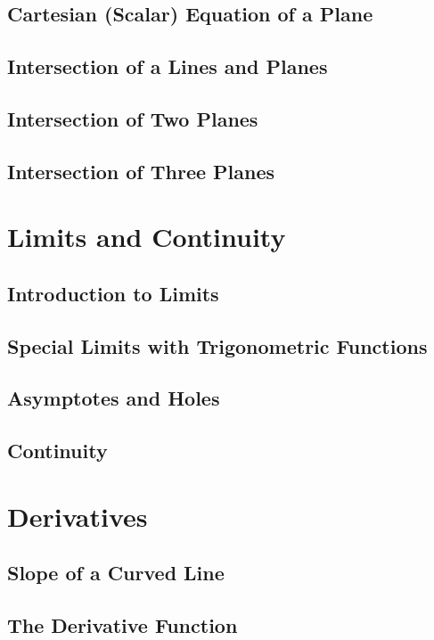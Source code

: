 \documentclass[12.5pt]{article}
\begin{document}
        \subsection{Cartesian (Scalar) Equation of a Plane}
        \subsection{Intersection of a Lines and Planes}
        \subsection{Intersection of Two Planes}
        \subsection{Intersection of Three Planes}

    \section{Limits and Continuity}
        \subsection{Introduction to Limits}
        \subsection{Special Limits with Trigonometric Functions}
        \subsection{Asymptotes and Holes}
        \subsection{Continuity}

    \clearpage

    \section{Derivatives}
        \subsection{Slope of a Curved Line}
        \subsection{The Derivative Function}
\end{document}
